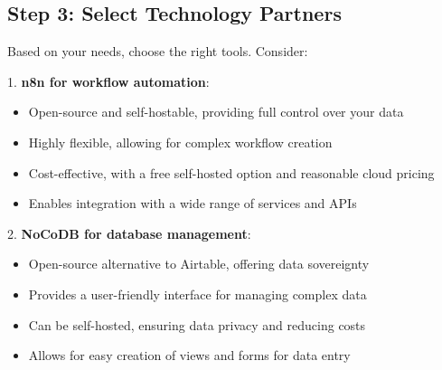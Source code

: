 
\subsection{Step 3: Select Technology Partners}

Based on your needs, choose the right tools. Consider:

1. \textbf{n8n for workflow automation}:
\begin{itemize}
    \item Open-source and self-hostable, providing full control over your data
    \item Highly flexible, allowing for complex workflow creation
    \item Cost-effective, with a free self-hosted option and reasonable cloud pricing
    \item Enables integration with a wide range of services and APIs
\end{itemize}

2. \textbf{NoCoDB for database management}:
\begin{itemize}
    \item Open-source alternative to Airtable, offering data sovereignty
    \item Provides a user-friendly interface for managing complex data
    \item Can be self-hosted, ensuring data privacy and reducing costs
    \item Allows for easy creation of views and forms for data entry
\end{itemize}

